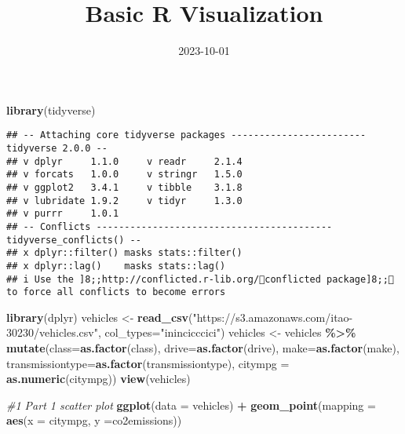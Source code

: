 \documentclass[
]{article}
\title{Basic R Visualization}
\author{}
\date{\vspace{-2.5em}2023-10-01}
\newenvironment{Shaded}{\begin{snugshade}}{\end{snugshade}}
\newcommand{\AttributeTok}[1]{\textcolor[rgb]{0.13,0.29,0.53}{#1}}
\newcommand{\CommentTok}[1]{\textcolor[rgb]{0.56,0.35,0.01}{\textit{#1}}}
\newcommand{\FunctionTok}[1]{\textcolor[rgb]{0.13,0.29,0.53}{\textbf{#1}}}
\newcommand{\NormalTok}[1]{#1}
\newcommand{\OtherTok}[1]{\textcolor[rgb]{0.56,0.35,0.01}{#1}}
\newcommand{\SpecialCharTok}[1]{\textcolor[rgb]{0.81,0.36,0.00}{\textbf{#1}}}
\newcommand{\StringTok}[1]{\textcolor[rgb]{0.31,0.60,0.02}{#1}}
\begin{document}
\maketitle

\begin{Shaded}
\begin{Highlighting}[]
\FunctionTok{library}\NormalTok{(tidyverse)}
\end{Highlighting}
\end{Shaded}

\begin{verbatim}
## -- Attaching core tidyverse packages ------------------------ tidyverse 2.0.0 --
## v dplyr     1.1.0     v readr     2.1.4
## v forcats   1.0.0     v stringr   1.5.0
## v ggplot2   3.4.1     v tibble    3.1.8
## v lubridate 1.9.2     v tidyr     1.3.0
## v purrr     1.0.1     
## -- Conflicts ------------------------------------------ tidyverse_conflicts() --
## x dplyr::filter() masks stats::filter()
## x dplyr::lag()    masks stats::lag()
## i Use the ]8;;http://conflicted.r-lib.org/conflicted package]8;; to force all conflicts to become errors
\end{verbatim}

\begin{Shaded}
\begin{Highlighting}[]
\FunctionTok{library}\NormalTok{(dplyr)}
\NormalTok{vehicles }\OtherTok{\textless{}{-}} \FunctionTok{read\_csv}\NormalTok{(}\StringTok{"https://s3.amazonaws.com/itao{-}30230/vehicles.csv"}\NormalTok{,}
                     \AttributeTok{col\_types=}\StringTok{"inincicccici"}\NormalTok{)}
\NormalTok{vehicles }\OtherTok{\textless{}{-}}\NormalTok{ vehicles }\SpecialCharTok{\%\textgreater{}\%}
  \FunctionTok{mutate}\NormalTok{(}\AttributeTok{class=}\FunctionTok{as.factor}\NormalTok{(class), }\AttributeTok{drive=}\FunctionTok{as.factor}\NormalTok{(drive), }\AttributeTok{make=}\FunctionTok{as.factor}\NormalTok{(make),}
         \AttributeTok{transmissiontype=}\FunctionTok{as.factor}\NormalTok{(transmissiontype), }\AttributeTok{citympg =} \FunctionTok{as.numeric}\NormalTok{(citympg))}
\FunctionTok{view}\NormalTok{(vehicles)}
\end{Highlighting}
\end{Shaded}

\begin{Shaded}
\begin{Highlighting}[]
\CommentTok{\#1 Part 1 scatter plot}
\FunctionTok{ggplot}\NormalTok{(}\AttributeTok{data =}\NormalTok{ vehicles) }\SpecialCharTok{+}
  \FunctionTok{geom\_point}\NormalTok{(}\AttributeTok{mapping =} \FunctionTok{aes}\NormalTok{(}\AttributeTok{x =}\NormalTok{ citympg, }\AttributeTok{y =}\NormalTok{co2emissions))}
\end{Highlighting}
\end{Shaded}
\end{document}
